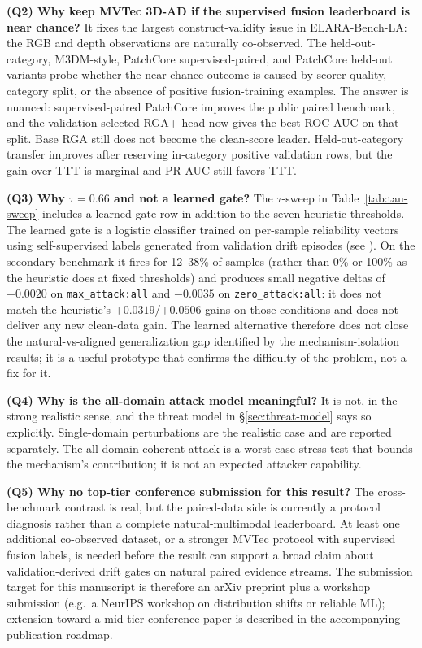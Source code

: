 \documentclass[10pt,conference]{IEEEtran}
\newcommand{\method}{RGA}
\newcommand{\methodplus}{RGA+}
\newcommand{\benchmark}{ELARA-Bench-LA}
\begin{document}
\noindent\textbf{(Q2) Why keep MVTec 3D-AD if the supervised fusion leaderboard
is near chance?} It fixes the largest construct-validity issue in
\benchmark{}: the RGB and depth observations are naturally co-observed. The
held-out-category, M3DM-style, PatchCore supervised-paired, and PatchCore
held-out variants probe whether the near-chance outcome is caused by scorer
quality, category split, or the absence of positive fusion-training examples.
The answer is nuanced: supervised-paired PatchCore improves the public paired
benchmark, and the validation-selected \methodplus{} head now gives the best
ROC-AUC on that split. Base \method{} still does not become the clean-score
leader. Held-out-category transfer improves after reserving in-category
positive validation rows, but the gain over TTT is marginal and PR-AUC still
favors TTT.

\noindent\textbf{(Q3) Why $\tau=0.66$ and not a learned gate?} The
$\tau$-sweep in Table~\ref{tab:tau-sweep} includes a learned-gate row in
addition to the seven heuristic thresholds. The learned gate is a
logistic classifier trained on per-sample reliability vectors using
self-supervised labels generated from validation drift episodes (see
). On the secondary
benchmark it fires for 12--38\% of samples (rather than 0\% or 100\% as
the heuristic does at fixed thresholds) and produces small negative
deltas of $-0.0020$ on \texttt{max\_attack:all} and $-0.0035$ on
\texttt{zero\_attack:all}: it does not match the heuristic's
$+0.0319$/$+0.0506$ gains on those conditions and does not deliver any
new clean-data gain. The learned alternative therefore does not close
the natural-vs-aligned generalization gap identified by the
mechanism-isolation results; it is a useful prototype that confirms
the difficulty of the problem, not a fix for it.

\noindent\textbf{(Q4) Why is the all-domain attack model meaningful?} It
is not, in the strong realistic sense, and the threat model in
§\ref{sec:threat-model} says so explicitly. Single-domain perturbations
are the realistic case and are reported separately. The all-domain
coherent attack is a worst-case stress test that bounds the mechanism's
contribution; it is not an expected attacker capability.

\noindent\textbf{(Q5) Why no top-tier conference submission for this
result?} The cross-benchmark contrast is real, but the paired-data side is
currently a protocol diagnosis rather than a complete natural-multimodal
leaderboard. At least one additional co-observed dataset, or a stronger
MVTec protocol with supervised fusion labels, is needed before the result can
support a broad claim about validation-derived drift gates on natural paired
evidence streams. The submission target for this manuscript is therefore an
arXiv preprint plus a workshop submission (e.g.~a NeurIPS workshop on
distribution shifts or reliable ML); extension toward a mid-tier conference
paper is described in the accompanying publication roadmap.
\end{document}
